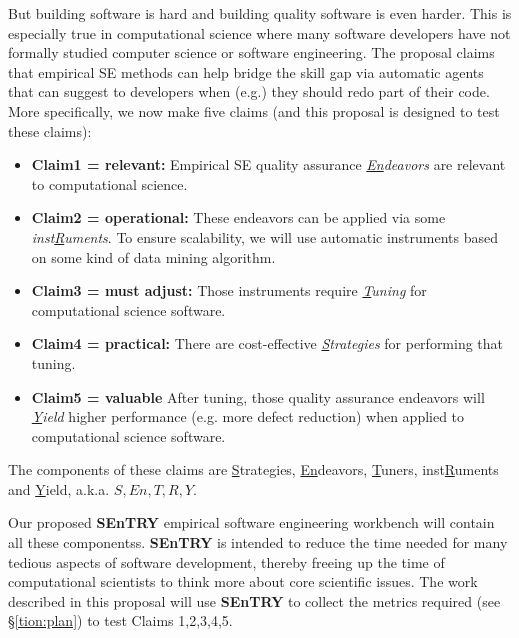 \documentclass{NSF}
\newenvironment{myitemize}
{ \begin{itemize}
    \setlength{\itemsep}{0pt}
    \setlength{\parskip}{0pt}
    \setlength{\parsep}{0pt}     }
{ \end{itemize}                  }
\newcommand{\bi}{\begin{myitemize}}
\newcommand{\ei}{\end{myitemize}}
\newcommand{\tion}[1]{\S\ref{tion:#1}}
\newcommand{\IT}{{\bf {\sffamily SEnTRY}}}
\begin{document}
\begin{nsfdescription}
But building software is hard and building quality software is even harder. This is
especially true in computational science
where many software  developers have not formally studied computer science or software engineering.
 The proposal claims that empirical SE methods can help bridge the skill gap via automatic
 agents that can suggest to developers when (e.g.)  they should redo part of their code.
 More specifically, we now make five claims (and this proposal is designed
to test these claims): 
\bi
\item {\bf Claim1 = relevant:}   Empirical SE quality assurance {\em \underline{En}deavors}
are relevant  to computational science.
\item
{\bf Claim2 = operational:}
These endeavors can be applied via some
{\em inst\underline{R}uments}. To ensure   scalability, we will use automatic instruments  based on some kind of data mining algorithm.
\item 
{\bf Claim3 = must adjust:}
Those instruments require   {\em \underline{T}uning} for
 computational science software. 
\item
{\bf Claim4 = practical:}
There are   cost-effective {\em \underline{S}trategies}
for   performing that tuning.
\item
{\bf Claim5 = valuable}
After  tuning, those quality  assurance endeavors will {\em \underline{Y}ield}
higher performance (e.g. more defect reduction) when applied to   computational science software.
\ei
The   components of these claims
are 
\underline{S}trategies, \underline{En}deavors, 
\underline{T}uners,
inst\underline{R}uments and \underline{Y}ield, a.k.a. $S, \mathit{En}, T,R,Y$.

Our proposed {\IT} empirical software engineering workbench will
contain all these componentss. {\IT}
is intended to reduce the time needed for many tedious aspects of software development, thereby freeing up the time of computational scientists to think more about core scientific issues. The work described in this proposal
will use {\IT} to collect the metrics required
(see \tion{plan})
to test Claims 1,2,3,4,5.


\end{nsfdescription}
\end{document}
